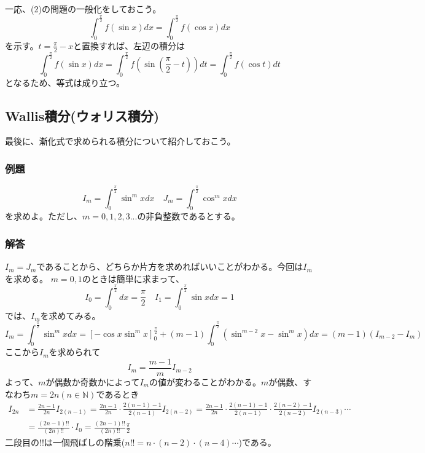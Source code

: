 \documentclass[a4j,dvipdfmx]{jsarticle}
\begin{document}
\subsubsection*{}
一応、(2)の問題の一般化をしておこう。
\begin{equation*}
    \int_0^{\frac{\pi}{2}}f(\sin x)dx=\int_0^{\frac{\pi}{2}}f(\cos x)dx
\end{equation*}
を示す。$t=\frac{\pi}{2}-x$と置換すれば、左辺の積分は
\begin{equation*}
    \int_0^{\frac{\pi}{2}}f(\sin x)dx=\int_0^{\frac{\pi}{2}}f(\sin(\frac{\pi}{2}-t))dt=\int_0^{\frac{\pi}{2}}f(\cos t)dt
\end{equation*}
となるため、等式は成り立つ。
\newpage
\subsection{Wallis積分(ウォリス積分)}
最後に、漸化式で求められる積分について紹介しておこう。
\subsubsection*{例題}
\begin{equation*}
    I_m=\int_0^\frac{\pi}{2} \sin^m xdx\quad J_m=\int_0^\frac{\pi}{2}\cos^m xdx
\end{equation*}
を求めよ。ただし、$m=0,1,2,3...$の非負整数であるとする。
\subsubsection*{解答}
$I_m=J_m$であることから、どちらか片方を求めればいいことがわかる。今回は$I_m$を求める。
$m=0,1$のときは簡単に求まって、
\begin{equation*}
    I_0=\int_0^\frac{\pi}{2}dx=\frac{\pi}{2}\quad I_1 =\int_0^\frac{\pi}{2}\sin xdx=1
\end{equation*}
では、$I_{m}$を求めてみる。
\begin{equation*}
    I_{m}=\int_0^\frac{\pi}{2}\sin^{m}xdx=\left[-\cos x\sin^{m} x\right]_0^\frac{\pi}{2}+(m-1)\int_0^\frac{\pi}{2}(\sin^{m-2}x-\sin^m x)dx=(m-1)(I_{m-2}-I_m)
\end{equation*}
ここから$I_m$を求められて
\begin{equation*}
    I_m=\frac{m-1}{m}I_{m-2}
\end{equation*}
よって、$m$が偶数か奇数かによって$I_m$の値が変わることがわかる。$m$が偶数、すなわち$m=2n(n\in\mathbb{N})$であるとき
\begin{align*}
    I_{2n}&=\frac{2n-1}{2n}I_{2(n-1)}=\frac{2n-1}{2n}\cdot\frac{2(n-1)-1}{2(n-1)}I_{2(n-2)}=\frac{2n-1}{2n}\cdot\frac{2(n-1)-1}{2(n-1)}\cdot\frac{2(n-2)-1}{2(n-2)}I_{2(n-3)}\cdots\\
    &=\frac{(2n-1)!!}{(2n)!!}\cdot I_0=\frac{(2n-1)!!}{(2n)!!}\frac{\pi}{2}
\end{align*}
二段目の$!!$は一個飛ばしの階乗($n!!=n\cdot(n-2)\cdot(n-4)\cdots$)である。
\end{document}
